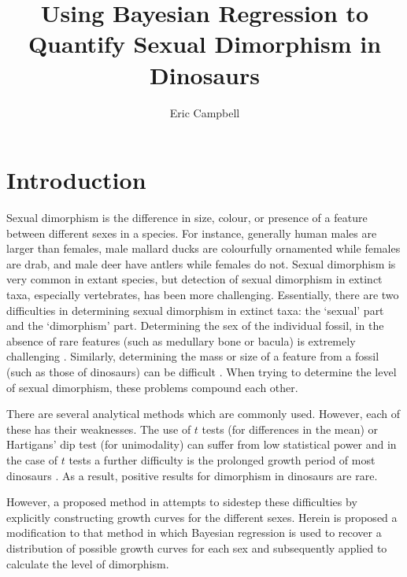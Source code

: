 \documentclass[letterpaper]{article}
\title{Using Bayesian Regression to Quantify Sexual Dimorphism in Dinosaurs}
\author{Eric Campbell}
\begin{document}
\maketitle

\newcommand{\species}[1]{\textit{#1}}
\newcommand{\tyran}{\species{Tyrannosaurus rex}{}}
\newcommand{\psit}{\species{Psittacosurus lujiatunensis}{}}
\newcommand{\maia}{\species{Maiasaura peeblesorum}{}}
\newcommand{\normal}[2]{\ensuremath{\mathcal{N}\left(#1, #2\right)}}

\section{Introduction}
Sexual dimorphism is the difference in size, colour, or presence of a feature between different sexes in a species. For instance, generally human males are larger than females, male mallard ducks are colourfully ornamented while females are drab, and male deer have antlers while females do not. Sexual dimorphism is very common in extant species, but detection of sexual dimorphism in extinct taxa, especially vertebrates, has been more challenging. Essentially, there are two difficulties in determining sexual dimorphism in extinct taxa: the `sexual' part and the `dimorphism' part. Determining the sex of the individual fossil, in the absence of rare features (such as medullary bone or bacula) is extremely challenging \parencite{saittaEffectSizeStatistical2020}. Similarly, determining the mass or size of a feature from a fossil (such as those of dinosaurs) can be difficult \parencite[p.~126]{brusatte2012}. When trying to determine the level of sexual dimorphism, these problems compound each other.

There are several analytical methods which are commonly used. However, each of these has their weaknesses. The use of $t$ tests (for differences in the mean) or Hartigans' dip test (for unimodality) can suffer from low statistical power \parencite{mallonRecognizingSexualDimorphism2017} and in the case of $t$ tests a further difficulty is the prolonged growth period of most dinosaurs \parencite{honeProtractedGrowthImpedes2017}. As a result, positive results for dimorphism in dinosaurs are rare.

However, a proposed method in \cite{saittaEffectSizeStatistical2020} attempts to sidestep these difficulties by explicitly constructing growth curves for the different sexes. Herein is proposed a modification to that method in which Bayesian regression is used to recover a distribution of possible growth curves for each sex and subsequently applied to calculate the level of dimorphism.
\end{document}
